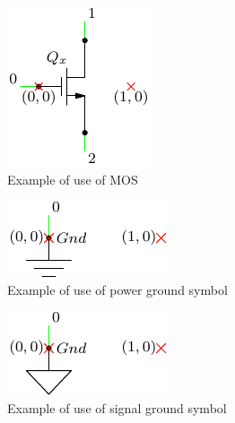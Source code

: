 \documentclass[a4paper,12pt]{report}
\begin{document}
\begin{figure}[h]
\centering
\includegraphics{mosInfo}
\caption{Example of use of MOS}
\label{mosInfo} %
\end{figure}

\begin{figure}[h]
\centering
\includegraphics{gndPowerInfo}
\caption{Example of use of power ground symbol}
\label{gndPowerInfo} %
\end{figure}

\begin{figure}[h]
\centering
\includegraphics{gndSignalInfo}
\caption{Example of use of signal ground symbol}
\label{gndSignalInfo} %
\end{figure}
\end{document}
